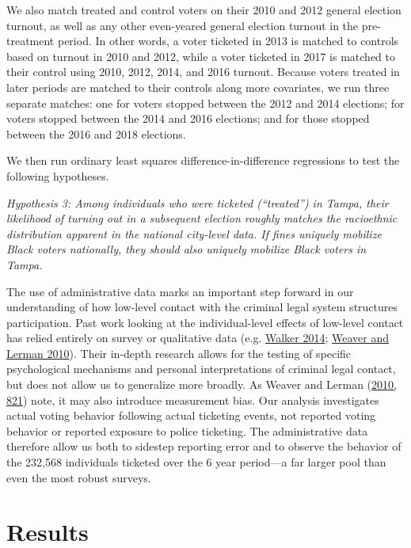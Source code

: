 \documentclass[
  12pt,
]{article}
\begin{document}
We also match treated and control voters on their 2010 and 2012 general election turnout, as well as any other even-yeared general election turnout in the pre-treatment period. In other words, a voter ticketed in 2013 is matched to controls based on turnout in 2010 and 2012, while a voter ticketed in 2017 is matched to their control using 2010, 2012, 2014, and 2016 turnout. Because voters treated in later periods are matched to their controls along more covariates, we run three separate matches: one for voters stopped between the 2012 and 2014 elections; for voters stopped between the 2014 and 2016 elections; and for those stopped between the 2016 and 2018 elections.

We then run ordinary least squares difference-in-difference regressions to test the following hypotheses.

\emph{Hypothesis 3: Among individuals who were ticketed (``treated'') in Tampa, their likelihood of turning out in a subsequent election roughly matches the racioethnic distribution apparent in the national city-level data. If fines uniquely mobilize Black voters nationally, they should also uniquely mobilize Black voters in Tampa.}

The use of administrative data marks an important step forward in our understanding of how low-level contact with the criminal legal system structures participation. Past work looking at the individual-level effects of low-level contact has relied entirely on survey or qualitative data (e.g. \protect\hyperlink{ref-Walker2014}{Walker 2014}; \protect\hyperlink{ref-Weaver2010}{Weaver and Lerman 2010}). Their in-depth research allows for the testing of specific psychological mechanisms and personal interpretations of criminal legal contact, but does not allow us to generalize more broadly. As Weaver and Lerman (\protect\hyperlink{ref-Weaver2010}{2010, 821}) note, it may also introduce measurement bias. Our analysis investigates actual voting behavior following actual ticketing events, not reported voting behavior or reported exposure to police ticketing. The administrative data therefore allow us both to sidestep reporting error and to observe the behavior of the 232,568 individuals ticketed over the 6 year period---a far larger pool than even the most robust surveys.

\hypertarget{results}{%
\section*{Results}\label{results}}
\end{document}

